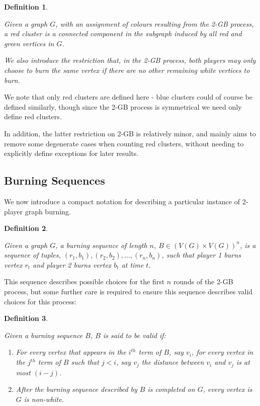 \documentclass{mpaper}
\newtheorem{definition}{Definition}[section]
\begin{document}
\begin{definition}
  \label{def/clusters}

Given a graph $G$, with an assignment of colours resulting from the 2-GB process, a \emph{red cluster} is a connected component in the subgraph induced by all red and green vertices in $G$. 

We also introduce the restriction that, in the 2-GB process, both players may only choose to burn the same vertex if there are no other remaining white vertices to burn.
\end{definition}

We note that only red clusters are defined here - blue clusters could of course be defined similarly, though since the 2-GB process is symmetrical we need only define red clusters.

In addition, the latter restriction on 2-GB is relatively minor, and mainly aims to remove some degenerate cases when counting red clusters, without needing to explicitly define exceptions for later results.

\subsection{Burning Sequences}

We now introduce a compact notation for describing a particular instance of 2-player graph burning.

\begin{definition}
\label{def/burning-sequence}

Given a graph $G$, a \emph{burning sequence} of length $n$, $B \in (V(G) \times V(G))^n$, is a sequence of tuples, $(r_1, b_1), (r_2, b_2), \dots, (r_n, b_n)$, such that player 1 burns vertex $r_t$ and player 2 burns vertex $b_t$ at time $t$.
\end{definition}

This sequence describes possible choices for the first $n$ rounds of the 2-GB process, but some further care is required to ensure this sequence describes valid choices for this process:

\begin{definition}
\label{def/valid-burning}

Given a burning sequence $B$, $B$ is said to be \emph{valid} if:

\begin{enumerate}
  \item For every vertex that appears in the $i^{th}$ term of $B$, say $v_i$, for every vertex in the $j^{th}$ term of $B$ such that $j < i$, say $v_j$ the distance between $v_i$ and $v_j$ is at most $(i-j)$.
  \item After the burning sequence described by $B$ is completed on $G$, every vertex is $G$ is non-white. 
\end{enumerate}

\end{definition}
\end{document}
